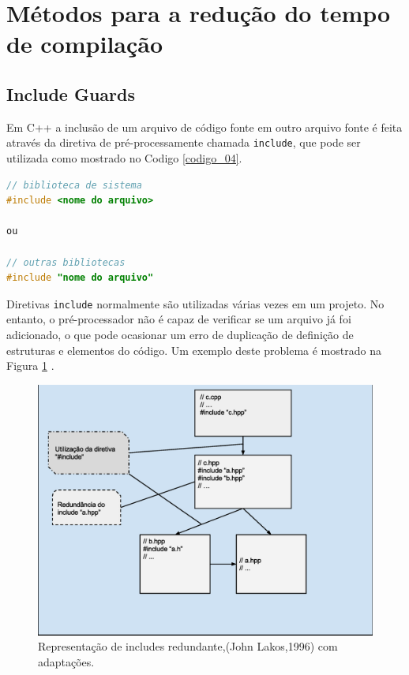 \section{Métodos para a redução do tempo de compilação}

\subsection{Include Guards}\label{include_guards_section}

Em C++ a inclusão de um arquivo de código fonte em outro arquivo fonte é feita
 através da diretiva de pré-processamente chamada \texttt{include}, que pode 
ser utilizada como mostrado no Codigo \ref{codigo_04}. 

\begin{lstlisting}[language=C++,frame=single,captionpos=b,caption={Diretiva de 
                           pré-processamento para inclusão de um arquivo},
                                                   label=codigo_04]
// biblioteca de sistema 
#include <nome do arquivo>  

ou

// outras bibliotecas 
#include "nome do arquivo"  

\end{lstlisting}


Diretivas \texttt{include} normalmente são utilizadas várias vezes em um projeto.
 No entanto, o pré-processador não é capaz de verificar se um arquivo já foi
 adicionado, o que pode ocasionar um erro de duplicação de definição de
 estruturas e elementos do código. Um exemplo deste problema é mostrado na
 Figura \ref{fig07} \cite{ref41}.

\begin{figure}[h]
    \centering
        \includegraphics[keepaspectratio=true,scale=0.6]{figuras/multi_include.eps}
    \caption{ Representação de includes redundante,(John Lakos,1996) com adaptações.}
    \label{fig07}
\end{figure}

